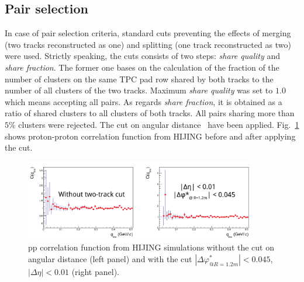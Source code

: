 


\subsection{Pair selection}
In case of pair selection criteria, standard cuts preventing the effects of merging (two tracks reconstructed as one) and splitting (one track reconstructed as two) were used. Strictly speaking, the cuts consists of two steps: \emph{share quality} and \emph{share fraction}. The former one bases on the calculation of the fraction of the number of clusters on the same TPC pad row shared by both tracks to the number of all clusters of the two tracks. Maximum \emph{share quality} was set to $1.0$ which means accepting all pairs. As regards \emph{share fraction}, it is obtained as a ratio of shared clusters to all clusters of both tracks. All pairs sharing more than $5 \%$ clusters were rejected.
The cut on angular distance~\cite{phistar} have been applied. Fig.~\ref{cfpphijingnophi} shows proton-proton correlation function from HIJING before and after applying the cut.
\begin{figure}%
  \centering
  \includegraphics[width=0.9\textwidth]{cfpphijing}
  \caption{pp correlation function from HIJING simulations without the cut on angular distance (left panel) and with the cut $|\Delta\varphi^*_{@R=1.2m}| < 0.045$, $|\Delta\eta| < 0.01$ (right panel).}
  \label{cfpphijingnophi}
\end{figure}
